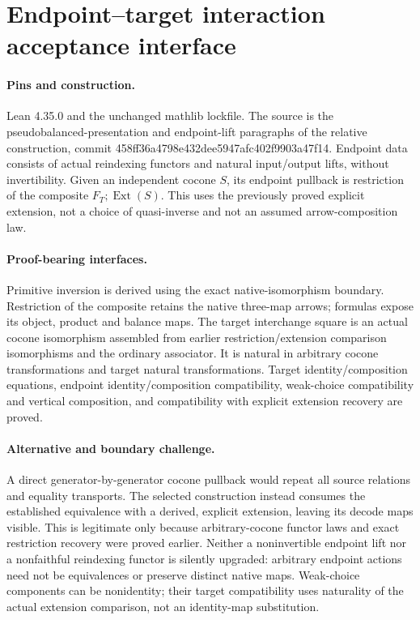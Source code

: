 \documentclass{article}
\begin{document}
\section*{Endpoint--target interaction acceptance interface}
\paragraph{Pins and construction.} Lean 4.35.0 and the unchanged mathlib lockfile. The source is the pseudobalanced-presentation and endpoint-lift paragraphs of the relative construction, commit 458ff36a4798e432dee5947afc402f9903a47f14. Endpoint data consists of actual reindexing functors and natural input/output lifts, without invertibility. Given an independent cocone $S$, its endpoint pullback is restriction of the composite $F_T;\operatorname{Ext}(S)$. This uses the previously proved explicit extension, not a choice of quasi-inverse and not an assumed arrow-composition law.
\paragraph{Proof-bearing interfaces.} Primitive inversion is derived using the exact native-isomorphism boundary. Restriction of the composite retains the native three-map arrows; formulas expose its object, product and balance maps. The target interchange square is an actual cocone isomorphism assembled from earlier restriction/extension comparison isomorphisms and the ordinary associator. It is natural in arbitrary cocone transformations and target natural transformations. Target identity/composition equations, endpoint identity/composition compatibility, weak-choice compatibility and vertical composition, and compatibility with explicit extension recovery are proved.
\paragraph{Alternative and boundary challenge.} A direct generator-by-generator cocone pullback would repeat all source relations and equality transports. The selected construction instead consumes the established equivalence with a derived, explicit extension, leaving its decode maps visible. This is legitimate only because arbitrary-cocone functor laws and exact restriction recovery were proved earlier. Neither a noninvertible endpoint lift nor a nonfaithful reindexing functor is silently upgraded: arbitrary endpoint actions need not be equivalences or preserve distinct native maps. Weak-choice components can be nonidentity; their target compatibility uses naturality of the actual extension comparison, not an identity-map substitution.
\end{document}
